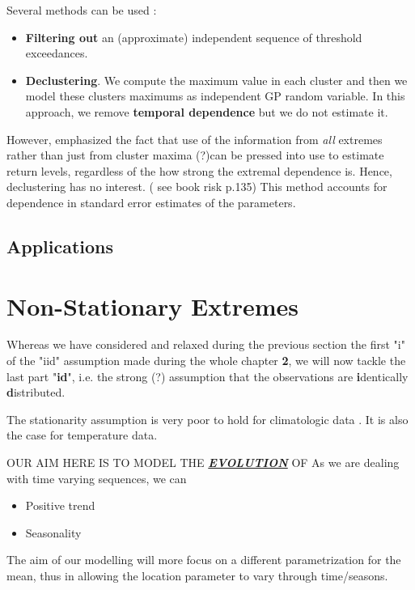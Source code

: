 \documentclass[11pt,a4paper,openany ]{book}
\begin{document}
Several methods can be used : 

\begin{itemize}
	\item \textbf{Filtering out} an (approximate) independent sequence of threshold exceedances.
	\item \textbf{Declustering}. We compute the maximum value in each cluster and then we model these clusters maximums as independent GP random variable. In this approach, we remove \textbf{temporal dependence} but we do not estimate it.
	
\end{itemize}


However, \cite{fawcett_estimating_2012} emphasized the fact that use of the information from \textit{all} extremes rather than just from cluster maxima (?)can be pressed into use to estimate return levels, regardless of the how strong the extremal dependence is. Hence, declustering has no interest. ( see book risk p.135)
This method accounts for dependence in standard error estimates of the parameters.


\subsection{Applications}

\section{Non-Stationary Extremes}\label{nstatio}

Whereas we have considered and relaxed during the previous section the first "i" of the "iid" assumption made during the whole chapter \textbf{2}, we will now tackle the last part "\textbf{id}", i.e. the strong (?) assumption that the observations are \textbf{i}dentically \textbf{d}istributed.

The stationarity assumption is very poor to hold for climatologic data \cite{milly_climate_2008}. It is also the case for temperature data.

OUR AIM HERE IS TO MODEL THE \textbf{\textit{\underline{EVOLUTION}}} OF 
As we are dealing with time varying sequences, we can

\begin{itemize}
	\item Positive trend
	\item Seasonality
\end{itemize}

The aim of our modelling will more focus on a different parametrization for the mean, thus in allowing the location parameter to vary through time/seasons.
\end{document}
